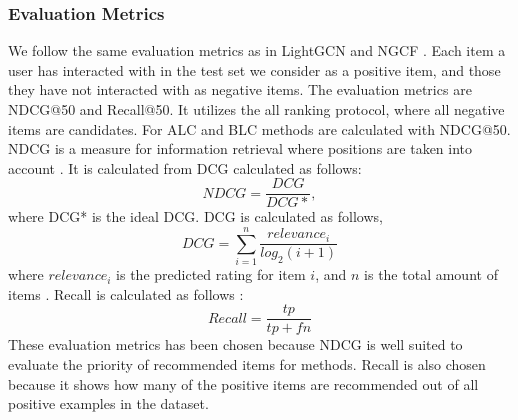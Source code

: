 \subsubsection{Evaluation Metrics}
We follow the same evaluation metrics as in LightGCN and NGCF \cite{lightgcn,NGCF_2019}.
Each item a user has interacted with in the test set we consider as a positive item, and those they have not interacted with as negative items.
The evaluation metrics are NDCG@50 and Recall@50.
It utilizes the all ranking protocol, where all negative items are candidates.
For ALC and BLC methods are calculated with NDCG@50.
NDCG is a measure for information retrieval where positions are taken into account \cite{Handbook}.
It is calculated from DCG calculated as follows:
\begin{equation}
    NDCG = \frac{DCG}{DCG*},
\end{equation}
where DCG* is the ideal DCG.
DCG is calculated as follows,
\begin{equation}
    DCG = \sum^n_{i=1} \frac{relevance_i}{log_2{(i+1)}}
\end{equation}
where $relevance_i$ is the predicted rating for item $i$, and $n$ is the total amount of items \cite{Handbook,Deep-Learning-on-Graphs-with-GCN}.
Recall is calculated as follows \cite{Handbook}:
\begin{equation}
    Recall = \frac{tp}{tp + fn}
\end{equation}
These evaluation metrics has been chosen because NDCG is well suited to evaluate the priority of recommended items for methods.
Recall is also chosen because it shows how many of the positive items are recommended out of all positive examples in the dataset.

